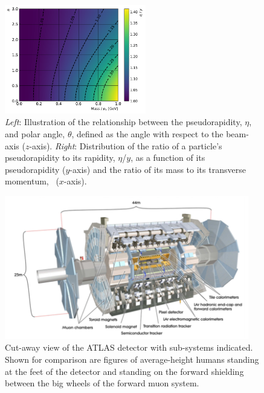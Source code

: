 \begin{figure}[!htb]
    \begin{center}
        \includegraphics[width=0.55\textwidth]{figures/chapter2/eta_vs_rap}
        \caption{
            \textit{Left}: Illustration of the relationship between the pseudorapidity, $\eta$,
                and polar angle, $\theta$, defined as the angle with respect to the beam-axis ($z$-axis).
            \textit{Right}: Distribution of the ratio of a particle's pseudorapidity to its rapidity, $\eta$/$y$,
                as a function of its pseudorapidity ($y$-axis) and the ratio of its mass to its transverse momentum, \pT~($x$-axis).
        }
        \label{fig:eta_desc}
    \end{center}
\end{figure}


\begin{figure}[!htb]
    \begin{center}
        \includegraphics[width=0.95\textwidth]{figures/chapter2/atlas_cutaway}
        \caption{
            Cut-away view of the ATLAS detector with sub-systems indicated.
            Shown for comparison are figures of average-height humans standing
            at the feet of the detector and standing on the forward shielding
            between the big wheels of the forward muon system.
        }
        \label{fig:atlas_cutaway}
    \end{center}
\end{figure}


